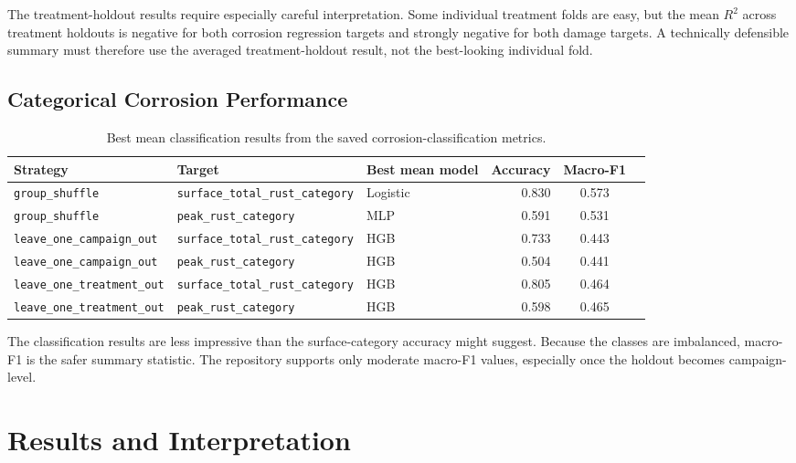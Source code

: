 \documentclass[11pt,a4paper]{article}
\begin{document}
The treatment-holdout results require especially careful interpretation. Some individual treatment folds are easy, but the mean \(R^2\) across treatment holdouts is negative for both corrosion regression targets and strongly negative for both damage targets. A technically defensible summary must therefore use the averaged treatment-holdout result, not the best-looking individual fold.

\subsection{Categorical Corrosion Performance}

\begin{table}[H]
\centering
\scriptsize
\begin{tabular}{lllrcc}
\toprule
\textbf{Strategy} & \textbf{Target} & \textbf{Best mean model} & \textbf{Accuracy} & \textbf{Macro-F1} \\
\midrule
\texttt{group\_shuffle} & \texttt{surface\_total\_rust\_category} & Logistic & 0.830 & 0.573 \\
\texttt{group\_shuffle} & \texttt{peak\_rust\_category} & MLP & 0.591 & 0.531 \\
\texttt{leave\_one\_campaign\_out} & \texttt{surface\_total\_rust\_category} & HGB & 0.733 & 0.443 \\
\texttt{leave\_one\_campaign\_out} & \texttt{peak\_rust\_category} & HGB & 0.504 & 0.441 \\
\texttt{leave\_one\_treatment\_out} & \texttt{surface\_total\_rust\_category} & HGB & 0.805 & 0.464 \\
\texttt{leave\_one\_treatment\_out} & \texttt{peak\_rust\_category} & HGB & 0.598 & 0.465 \\
\bottomrule
\end{tabular}
\caption{Best mean classification results from the saved corrosion-classification metrics.}
\label{tab:classification-results}
\end{table}

The classification results are less impressive than the surface-category accuracy might suggest. Because the classes are imbalanced, macro-F1 is the safer summary statistic. The repository supports only moderate macro-F1 values, especially once the holdout becomes campaign-level.

\section{Results and Interpretation}
\end{document}
